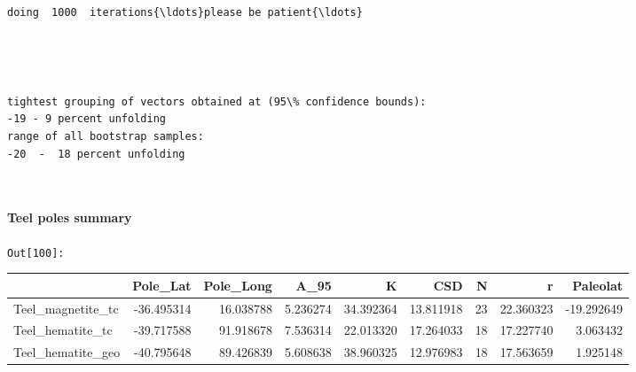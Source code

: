 \documentclass[11pt]{article}
\begin{document}
    \begin{Verbatim}[commandchars=\\\{\}]
doing  1000  iterations{\ldots}please be patient{\ldots}
    \end{Verbatim}

    \begin{center}
    \end{center}
    { \hspace*{\fill} \\}
    
    \begin{center}
    \end{center}
    { \hspace*{\fill} \\}
    
    \begin{Verbatim}[commandchars=\\\{\}]
tightest grouping of vectors obtained at (95\% confidence bounds):
-19 - 9 percent unfolding
range of all bootstrap samples: 
-20  -  18 percent unfolding
    \end{Verbatim}

    \begin{center}
    \end{center}
    { \hspace*{\fill} \\}
    
    \paragraph{Teel poles summary}\label{teel-poles-summary}

\texttt{\color{outcolor}Out[{\color{outcolor}100}]:}
    
    {\tiny\begin{tabular}{lrrrrrrrr}
\toprule
{} &   Pole\_Lat &  Pole\_Long &      A\_95 &          K &        CSD &   N &          r &   Paleolat \\
\midrule
Teel\_magnetite\_tc & -36.495314 &  16.038788 &  5.236274 &  34.392364 &  13.811918 &  23 &  22.360323 & -19.292649 \\
Teel\_hematite\_tc  & -39.717588 &  91.918678 &  7.536314 &  22.013320 &  17.264033 &  18 &  17.227740 &   3.063432 \\
Teel\_hematite\_geo & -40.795648 &  89.426839 &  5.608638 &  38.960325 &  12.976983 &  18 &  17.563659 &   1.925148 \\
\bottomrule
\end{tabular}}
\end{document}

